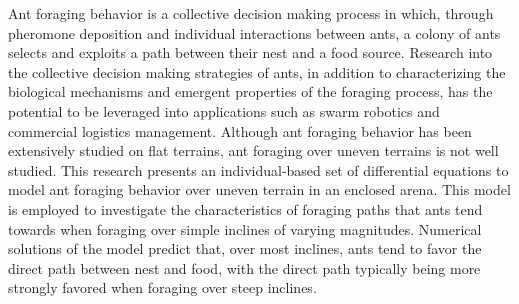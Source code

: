 Ant foraging behavior is a collective decision making process in which, through  pheromone deposition and individual interactions between ants, a colony of ants selects and exploits a path between their nest and a food source.
Research into the collective decision making strategies of ants, in addition to characterizing the biological mechanisms and emergent properties of the foraging process, has the potential to be leveraged into applications such as swarm robotics and commercial logistics management. Although ant foraging behavior has been extensively studied on flat terrains, ant foraging over uneven terrains is not well studied. This research presents an individual-based set of differential equations to model ant foraging behavior over uneven terrain in an enclosed arena. This model is employed to investigate the characteristics of foraging paths that ants tend towards when foraging over simple inclines of varying magnitudes. Numerical solutions of the model predict that, over most inclines, ants tend to favor the direct path between nest and food, with the direct path typically being more strongly favored when foraging over steep inclines.
